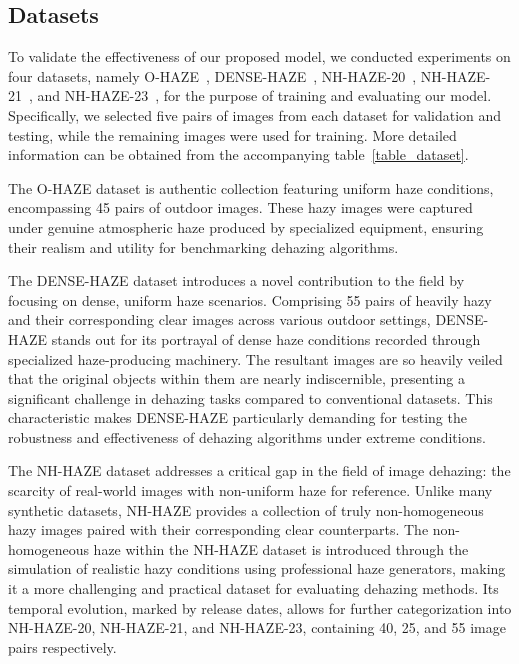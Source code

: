 \documentclass[journal]{IEEEtran}
\begin{document}
\subsection{Datasets}
To validate the effectiveness of our proposed model, we conducted experiments on four datasets, namely O-HAZE~\cite{ancuti2018ohaze}, DENSE-HAZE~\cite{ancuti2019dense}, NH-HAZE-20~\cite{ancuti2020ntire}, NH-HAZE-21~\cite{ancuti2021ntire}, and NH-HAZE-23~\cite{ancuti2023ntire}, for the purpose of training and evaluating our model. Specifically, we selected five pairs of images from each dataset for validation and testing, while the remaining images were used for training. More detailed information can be obtained from the accompanying table~\ref{table_dataset}.

The O-HAZE dataset is authentic collection featuring uniform haze conditions, encompassing 45 pairs of outdoor images. These hazy images were captured under genuine atmospheric haze produced by specialized equipment, ensuring their realism and utility for benchmarking dehazing algorithms.

The DENSE-HAZE dataset introduces a novel contribution to the field by focusing on dense, uniform haze scenarios. Comprising 55 pairs of heavily hazy and their corresponding clear images across various outdoor settings, DENSE-HAZE stands out for its portrayal of dense haze conditions recorded through specialized haze-producing machinery. The resultant images are so heavily veiled that the original objects within them are nearly indiscernible, presenting a significant challenge in dehazing tasks compared to conventional datasets. This characteristic makes DENSE-HAZE particularly demanding for testing the robustness and effectiveness of dehazing algorithms under extreme conditions.

The NH-HAZE dataset addresses a critical gap in the field of image dehazing: the scarcity of real-world images with non-uniform haze for reference. Unlike many synthetic datasets, NH-HAZE provides a collection of truly non-homogeneous hazy images paired with their corresponding clear counterparts. The non-homogeneous haze within the NH-HAZE dataset is introduced through the simulation of realistic hazy conditions using professional haze generators, making it a more challenging and practical dataset for evaluating dehazing methods. Its temporal evolution, marked by release dates, allows for further categorization into NH-HAZE-20, NH-HAZE-21, and NH-HAZE-23, containing 40, 25, and 55 image pairs respectively.
\end{document}
